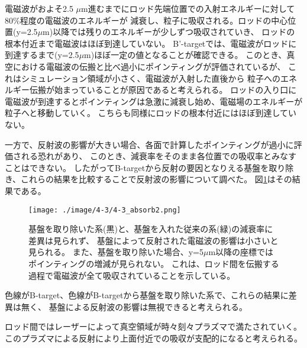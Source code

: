 \documentclass[a4paper,11pt,titlepage]{jsarticle}
\begin{document}
    電磁波がおよそ2.5 $\mu$m進むまでにロッド先端位置での入射エネルギーに対して80\%程度の電磁波のエネルギーが
    減衰し、粒子に吸収される。ロッドの中心位置(y=2.5$\mu$m)以降では残りのエネルギーが少しずつ吸収されていき、
    ロッドの根本付近まで電磁波はほぼ到達していない。
    B'-targetでは、電磁波がロッドに到達するまで(y=2.5$\mu$m)ほぼ一定の値となることが確認できる。
    このとき、真空における電磁波の伝搬と比べ過小にポインティングが評価されているが、
    これはシミュレーション領域が小さく、電磁波が入射した直後から
    粒子へのエネルギー伝搬が始まっていることが原因であると考えられる。
    ロッドの入り口に電磁波が到達するとポインティングは急激に減衰し始め、電磁場のエネルギーが粒子へと移動していく。
    こちらも同様にロッドの根本付近にはほぼ到達していない。

    一方で、反射波の影響が大きい場合、各面で計算したポインティングが過小に評価される恐れがあり、
    このとき、減衰率をそのまま各位置での吸収率とみなすことはできない。
    したがってB-targetから反射の要因となりえる基盤を取り除き、これらの結果を比較することで反射波の影響について調べた。
    図\ref{fig:4-3_absorb2}はその結果である。
    \begin{figure}[H]
      \begin{center}
        \texttt{[image: ./image/4-3/4-3\_absorb2.png]}
        \caption{
          \label{fig:4-3_absorb2}
           基盤を取り除いた系(黒)と、基盤を入れた従来の系(緑)の減衰率に差異は見られず、
           基盤によって反射された電磁波の影響は小さいと見られる。
           また、基盤を取り除いた場合、y=5$\mu$m以降の座標ではポインティングの増減が見られない。
           これは、ロッド間を伝搬する過程で電磁波が全て吸収されていることを示している。
        }
      \end{center}
    \end{figure}
    色線がB-target、色線がB-targetから基盤を取り除いた系で、これらの結果に差異は無く、
    基盤による反射波の影響は無視できると考えられる。

    ロッド間ではレーザーによって真空領域が時々刻々プラズマで満たされていく。
    このプラズマによる反射により上面付近での吸収が支配的になると考えられる。

    \newpage
\end{document}
